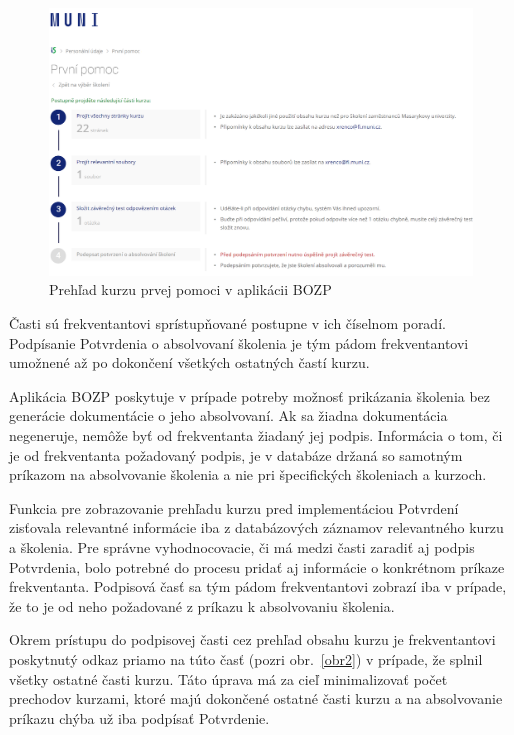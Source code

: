 \documentclass[
  digital,     %
  oneside,     %
  nosansbold,  %
  nocolorbold, %
  lof,         %
  nolot,         %
]{fithesis4}
\begin{document}
\begin{figure}
  \begin{center}
    \includegraphics[width=\textwidth]{prehledvyberu.png}
  \end{center}
  \caption{Prehľad kurzu prvej pomoci v aplikácii BOZP}
  \label{obr1}
\end{figure}

\noindent
Časti sú frekventantovi sprístupňované postupne v ich číselnom poradí.
Podpísanie Potvrdenia o absolvovaní školenia je tým pádom frekventantovi umožnené až po dokončení všetkých ostatných častí kurzu.

Aplikácia BOZP poskytuje v prípade potreby možnosť prikázania školenia bez generácie dokumentácie o jeho absolvovaní. Ak sa žiadna dokumentácia negeneruje, nemôže byť od frekventanta žiadaný jej podpis. Informácia o tom, či je od frekventanta požadovaný podpis, je v databáze držaná so samotným príkazom na absolvovanie školenia a nie pri špecifických školeniach a kurzoch.

Funkcia pre zobrazovanie prehľadu kurzu pred implementáciou Potvrdení zisťovala relevantné informácie iba z databázových záznamov relevantného kurzu a školenia. Pre správne vyhodnocovacie, či má medzi časti zaradiť aj podpis Potvrdenia, bolo potrebné do procesu pridať aj informácie o konkrétnom príkaze frekventanta. Podpisová časť sa tým pádom frekventantovi zobrazí iba v prípade, že to je od neho požadované z príkazu k absolvovaniu školenia.

Okrem prístupu do podpisovej časti cez prehľad obsahu kurzu je frekventantovi poskytnutý odkaz priamo na túto časť (pozri obr.~\ref{obr2}) v prípade, že splnil všetky ostatné časti kurzu. Táto úprava má za cieľ minimalizovať počet prechodov kurzami, ktoré majú dokončené ostatné časti kurzu a na absolvovanie príkazu chýba už iba podpísať Potvrdenie.
\end{document}
